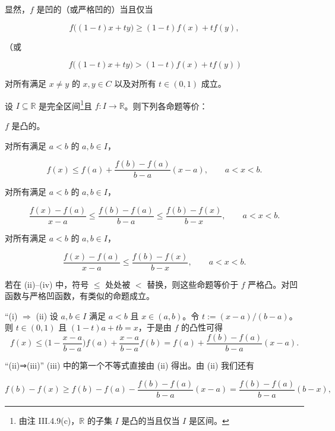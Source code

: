 \begin{remark}

\begin{items}
\item

显然，$f$ 是凹的（或严格凹的）当且仅当

\[
f\big((1-t)x+ty\big)\geq(1-t)f(x)+tf(y),
\]

（或

\[
f\big((1-t)x+ty\big)>(1-t)f(x)+tf(y)\ \Big)
\]

对所有满足 $ x \neq y $ 的 $ x, y \in C $ 以及对所有 $ t \in (0,1) $ 成立。

\item

设 $ I \subseteq \mathbb{R} $ 是完全区间\footnote{由注 III.4.9(c)，$ \mathbb{R} $ 的子集 $ I $ 是凸的当且仅当 $ I $ 是区间。}且 $ f: I \to \mathbb{R} $。则下列各命题等价：

\begin{subitems}
\item

$f$ 是凸的。

\item

对所有满足 $a < b$ 的 $ a, b \in I $，

\[
f(x)\leq f(a)+\frac{f(b)-f(a)}{b-a}(x-a),\qquad a<x<b.
\]
\item

对所有满足 $a < b$ 的 $ a, b \in I $，

\[
\frac{f(x)-f(a)}{x-a}\leq\frac{f(b)-f(a)}{b-a}\leq\frac{f(b)-f(x)}{b-x},\qquad a<x<b.
\]
\item

对所有满足 $a < b$ 的 $ a, b \in I $，

\[
\frac{f(x)-f(a)}{x-a}\leq\frac{f(b)-f(x)}{b-x},\qquad a<x<b.
\]

若在 (ii)–(iv) 中，符号 $ \leq $ 处处被 $<$ 替换，则这些命题等价于 $f$ 严格凸。对凹函数与严格凹函数，有类似的命题成立。

\proofhead
“(i) $\Rightarrow$ (ii) 设 $a, b \in I$ 满足 $a < b$ 且 $x \in (a, b)$。令 $t := (x - a)/(b - a)$。则 $t \in (0,1)$ 且 $(1 - t)a + tb = x$，于是由 $f$ 的凸性可得
\[
f(x)\leq\Big(1-\frac{x-a}{b-a}\Big)f(a)+\frac{x-a}{b-a}f(b)=f(a)+\frac{f(b)-f(a)}{b-a}(x-a).
\]

“(ii)⇒(iii)” (iii) 中的第一个不等式直接由 (ii) 得出。由 (ii) 我们还有

\[
f(b)-f(x)\geq f(b)-f(a)-\frac{f(b)-f(a)}{b-a}(x-a)=\frac{f(b)-f(a)}{b-a}(b-x),
\]


\end{subitems}
\end{items}
\end{remark}

